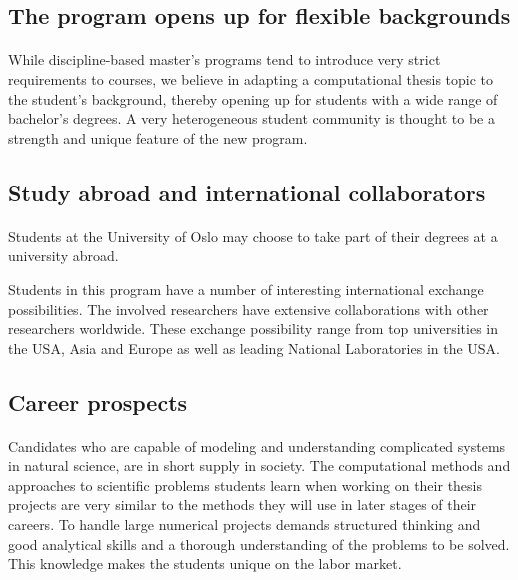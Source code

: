 \documentclass[%
twoside,                 %
final,                   %
10pt]{article}
\begin{document}
\noindent



\subsection*{The program opens up for flexible backgrounds}


\paragraph{}
While discipline-based master's programs tend to introduce very strict
requirements to courses, we believe in adapting a computational thesis
topic to the student's background, thereby opening up for
students with a wide range of bachelor's degrees.
A very heterogeneous student community is thought to be a strength and
unique feature of the new program.



\subsection*{Study abroad and international collaborators}


\paragraph{}

Students at the University of Oslo may choose to take part of
their degrees at a university abroad.

Students in this program have a number of interesting international
exchange possibilities. The involved researchers have extensive
collaborations with other researchers worldwide. These exchange
possibility range from top universities in the USA, Asia and Europe as
well as leading National Laboratories in the USA.  



\subsection*{Career prospects}


\paragraph{}
Candidates who are capable of modeling and understanding complicated
systems in natural science, are in short supply in society.  The
computational methods and approaches to scientific problems students learn
when working on their thesis projects are very similar to the methods
they will use in later stages of their careers.  To handle large
numerical projects demands structured thinking and good analytical
skills and a thorough understanding of the problems to be solved. This
knowledge makes the students unique on the labor market.
\end{document}
